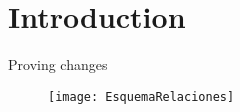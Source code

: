 \chapter{Introduction}

Proving changes

\begin{figure}[h!]
	\texttt{[image: EsquemaRelaciones]}
	\centering
\end{figure}
